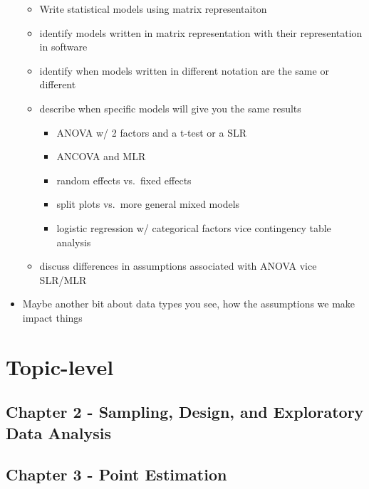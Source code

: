 \documentclass[]{book}
\providecommand{\tightlist}{%
  \setlength{\itemsep}{0pt}\setlength{\parskip}{0pt}}
\begin{document}
\begin{itemize}
  \begin{itemize}
  \tightlist
  \item
    Write statistical models using matrix representaiton
  \item
    identify models written in matrix representation with their representation in software
  \item
    identify when models written in different notation are the same or different
  \item
    describe when specific models will give you the same results

    \begin{itemize}
    \tightlist
    \item
      ANOVA w/ 2 factors and a t-test or a SLR
    \item
      ANCOVA and MLR
    \item
      random effects vs.~fixed effects
    \item
      split plots vs.~more general mixed models
    \item
      logistic regression w/ categorical factors vice contingency table analysis
    \end{itemize}
  \item
    discuss differences in assumptions associated with ANOVA vice SLR/MLR
  \end{itemize}
\item
  Maybe another bit about data types you see, how the assumptions we make impact things
\end{itemize}

\hypertarget{topic-level}{%
\section{Topic-level}\label{topic-level}}

\hypertarget{chapter-2---sampling-design-and-exploratory-data-analysis}{%
\subsection{Chapter 2 - Sampling, Design, and Exploratory Data Analysis}\label{chapter-2---sampling-design-and-exploratory-data-analysis}}

\hypertarget{chapter-3---point-estimation}{%
\subsection{Chapter 3 - Point Estimation}\label{chapter-3---point-estimation}}
\end{document}
